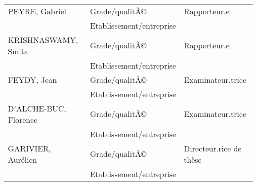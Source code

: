 \documentclass[openany]{now} %
\begin{document}
\begin{titlepage}
    \vspace{18pt}
	
	
	 \\
	
	\noindent \begin{tabular}{p{}p{}p{}}
		\textsc {PEYRE}, Gabriel & Grade/qualitÃ© & Rapporteur.e\\
		& Etablissement/entreprise & \\
		\textsc {KRISHNASWAMY}, Smita & Grade/qualitÃ© & Rapporteur.e\\
		& Etablissement/entreprise & \\
		\textsc {FEYDY}, Jean & Grade/qualitÃ© & Examinateur.trice\\
		& Etablissement/entreprise & \\ 
		\textsc {D'ALCHE-BUC}, Florence & Grade/qualitÃ© & Examinateur.trice\\
		& Etablissement/entreprise & \\ 
		\textsc {GARIVIER}, Aurélien & Grade/qualitÃ© & Directeur.rice de thèse\\
		& Etablissement/entreprise &  
	\end{tabular}
	
\end{titlepage}


\restoregeometry 

\tableofcontents

\mainmatter

% 













\end{document}

